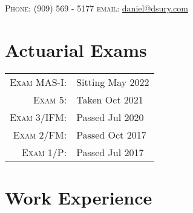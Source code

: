 \documentclass[a4paper,10pt]{article}
\begin{document}
\pagestyle{empty} %





\par{ \par} %
\begin{center}
\textsc{Phone:}  (909) 569 - 5177 \qquad
\textsc{email:}  \href{mailto:daniel@dsury.com}{daniel@dsury.com}
\end{center}


\section{Actuarial Exams}
\begin{tabular}{r|p{4cm}}
\textsc{Exam MAS-I: } & Sitting May 2022 \\
\textsc{Exam 5: } & Taken Oct 2021 \\
\textsc{Exam 3/IFM: } & Passed Jul 2020 \\
\textsc{Exam 2/FM: } & Passed Oct 2017 \\
\textsc{Exam 1/P: } & Passed Jul 2017
\end{tabular}



\section{Work Experience}
\end{document}

